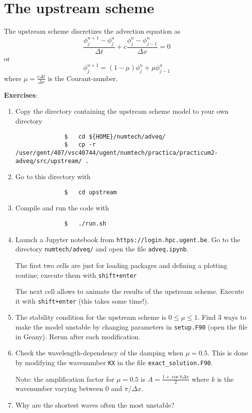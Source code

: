 \documentclass[a4paper]{article}
\begin{document}
\section{The upstream scheme}
%
\par
The upstream scheme discretizes the advection equation as
%
\begin{equation*}
	\frac{\phi^{n+1}_{j}-\phi^{n}_{j}}{\Delta t}+c\frac{\phi^{n}_{j}-\phi^{n}_{j-1}}{\Delta x}=0
\end{equation*}
%
or
%
\begin{equation*}
	\phi^{n+1}_{j}=(1-\mu)\phi^{n}_{j}+\mu\phi^{n}_{j-1}
\end{equation*}
%
where $\mu=\frac{c\Delta t}{\Delta x}$ is the Courant-number.
%
\par\vspace*{3ex}\clearpage
\textbf{Exercises}:
%
\begin{enumerate}
	\item Copy the directory containing the upstream scheme model to your own directory
		\begin{verbatim}
			  $   cd ${HOME}/numtech/adveq/
			  $   cp -r /user/gent/407/vsc40744/ugent/numtech/practica/practicum2-adveq/src/upstream/ .
		\end{verbatim}
	\item Go to this directory with
		\begin{verbatim}
			  $   cd upstream
		\end{verbatim}
	\item Compile and run the code with
		\begin{verbatim}
			  $   ./run.sh
		\end{verbatim}
	\item Launch a Jupyter notebook from \texttt{https://login.hpc.ugent.be}. Go to the directory \texttt{numtech/adveq/} and open the file \texttt{adveq.ipynb}.
		\par
		The first two cells are just for loading packages and defining a plotting routine; execute them with \texttt{shift+enter}
		\par
		The next cell allows to animate the results of the upstream scheme. Execute it with \texttt{shift+enter} (this takes some time!).
	\item The stability condition for the upstream scheme is $0\leq\mu\leq1$. Find 3 ways to make the model unstable by changing parameters in \verb+setup.F90+ (open the file in Geany). Rerun after each modification.
	\item Check the wavelength-dependency of the damping when $\mu=0.5$. This is done by modifying the wavenumber \verb+KX+ in the file \verb+exact_solution.F90+.
		\par
		Note: the amplification factor for $\mu=0.5$ is $A=\frac{1+\cos k\Delta x}{2}$ where $k$ is the wavenumber varying between 0 and $\pi/\Delta x$.
	\item Why are the shortest waves often the most unstable?
\end{enumerate}
%
\end{document}

